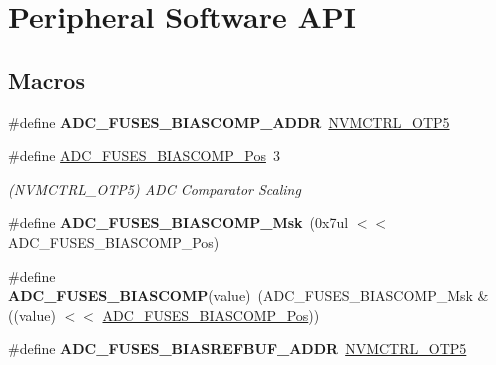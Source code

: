 \hypertarget{group__fuses__api}{}\section{Peripheral Software A\+P\+I}
\label{group__fuses__api}
\subsection*{Macros}
\begin{DoxyCompactItemize}
\item 
\hypertarget{group__fuses__api_ga03cd095a0fe41964cd6dd9a27de2ab37}{}\#define {\bfseries A\+D\+C\+\_\+\+F\+U\+S\+E\+S\+\_\+\+B\+I\+A\+S\+C\+O\+M\+P\+\_\+\+A\+D\+D\+R}~\hyperlink{group___s_a_m_l21_j18_a__base_ga0bf5d3de41242cbb1e7b91ef11d6b794}{N\+V\+M\+C\+T\+R\+L\+\_\+\+O\+T\+P5}\label{group__fuses__api_ga03cd095a0fe41964cd6dd9a27de2ab37}

\item 
\hypertarget{group__fuses__api_ga02986ff020daed440590016ebabda379}{}\#define \hyperlink{group__fuses__api_ga02986ff020daed440590016ebabda379}{A\+D\+C\+\_\+\+F\+U\+S\+E\+S\+\_\+\+B\+I\+A\+S\+C\+O\+M\+P\+\_\+\+Pos}~3\label{group__fuses__api_ga02986ff020daed440590016ebabda379}

\begin{DoxyCompactList}\small\item\em (N\+V\+M\+C\+T\+R\+L\+\_\+\+O\+T\+P5) A\+D\+C Comparator Scaling \end{DoxyCompactList}\item 
\hypertarget{group__fuses__api_ga2604950bc1b206c3573c6f3fa2a8aa62}{}\#define {\bfseries A\+D\+C\+\_\+\+F\+U\+S\+E\+S\+\_\+\+B\+I\+A\+S\+C\+O\+M\+P\+\_\+\+Msk}~(0x7ul $<$$<$ A\+D\+C\+\_\+\+F\+U\+S\+E\+S\+\_\+\+B\+I\+A\+S\+C\+O\+M\+P\+\_\+\+Pos)\label{group__fuses__api_ga2604950bc1b206c3573c6f3fa2a8aa62}

\item 
\hypertarget{group__fuses__api_gabc411d2fb432ec64a2d975eafd16851f}{}\#define {\bfseries A\+D\+C\+\_\+\+F\+U\+S\+E\+S\+\_\+\+B\+I\+A\+S\+C\+O\+M\+P}(value)~(A\+D\+C\+\_\+\+F\+U\+S\+E\+S\+\_\+\+B\+I\+A\+S\+C\+O\+M\+P\+\_\+\+Msk \& ((value) $<$$<$ \hyperlink{group__fuses__api_ga02986ff020daed440590016ebabda379}{A\+D\+C\+\_\+\+F\+U\+S\+E\+S\+\_\+\+B\+I\+A\+S\+C\+O\+M\+P\+\_\+\+Pos}))\label{group__fuses__api_gabc411d2fb432ec64a2d975eafd16851f}

\item 
\hypertarget{group__fuses__api_ga33778ae7d4d72c5bb8df96f3cc028962}{}\#define {\bfseries A\+D\+C\+\_\+\+F\+U\+S\+E\+S\+\_\+\+B\+I\+A\+S\+R\+E\+F\+B\+U\+F\+\_\+\+A\+D\+D\+R}~\hyperlink{group___s_a_m_l21_j18_a__base_ga0bf5d3de41242cbb1e7b91ef11d6b794}{N\+V\+M\+C\+T\+R\+L\+\_\+\+O\+T\+P5}\label{group__fuses__api_ga33778ae7d4d72c5bb8df96f3cc028962}


\end{DoxyCompactItemize}
